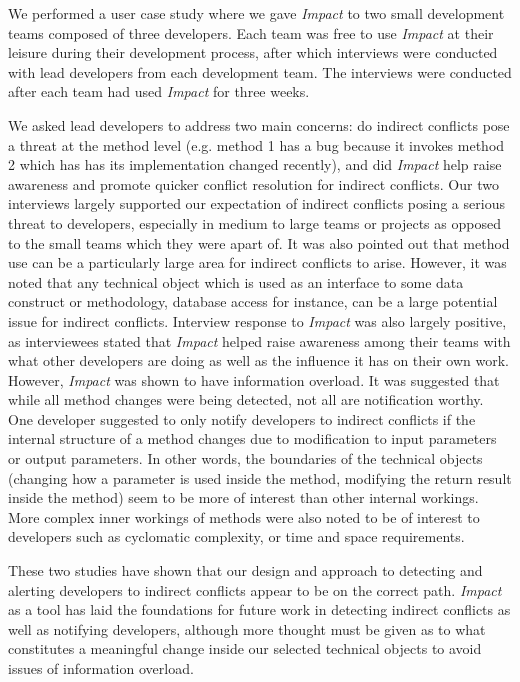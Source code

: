 \documentclass[conference]{IEEEtran}
\begin{document}
We performed a user case study where we gave \textit{Impact} to 
two small development teams composed of three developers. Each team was
free to use \textit{Impact} at their leisure during their development process,
after which interviews were conducted with lead developers from 
each development team. The interviews were conducted after each
team had used \textit{Impact} for three weeks.

We asked lead developers to address two main concerns: do indirect
conflicts pose a threat
at the method level (e.g. method 1 has a bug because it invokes method
2 which has has its implementation changed recently), 
and did \textit{Impact} help raise
awareness and promote quicker conflict resolution for indirect
conflicts. Our two interviews largely supported our expectation of
indirect conflicts posing a serious threat to developers, especially
in medium to large teams or projects as opposed to the small
teams which they were apart of. It was also pointed
out that method use can be a particularly large area for indirect
conflicts to arise. However, it was noted that
any technical object which is used as an interface to some data
construct or methodology, database access for instance, can be 
a large potential issue for indirect conflicts.  Interview response to
\textit{Impact} was also largely positive, as interviewees stated that \textit{Impact}
helped raise awareness among their teams with what other developers
are doing as well as the influence it has on their own work. However,
\textit{Impact} was shown to have information overload. It was suggested
that while all method changes were being detected,
not all are notification worthy. One developer suggested to only notify
developers to indirect conflicts if the internal structure of a method
changes due to modification to input parameters or output parameters.
In other words, the boundaries of the technical objects (changing
how a parameter is used inside the method, modifying the return
result inside the method) seem to be more of interest than other 
internal workings. More complex inner workings of methods were also noted 
to be of interest to developers
such as cyclomatic complexity, or time and space requirements.

These two studies have shown that our design and approach to
detecting and alerting developers to indirect conflicts appear
to be on the correct path. \textit{Impact} as a tool has laid the foundations
for future work in detecting indirect conflicts as well as notifying
developers, although more thought must be given as to 
what constitutes a meaningful change inside our selected 
technical objects to avoid issues of information overload.
\end{document}

